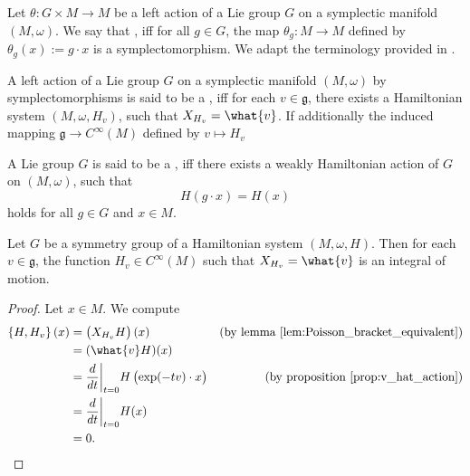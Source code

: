 Let $\theta : G \times M \to M$ be a left action of a Lie group $G$ on a symplectic manifold $(M,\omega)$. We say that , iff for all $g \in G$, the map $\theta_g : M \to M$ defined by $\theta_g(x) := g \cdot x$ is a symplectomorphism. We adapt the terminology provided in \cite[203]{salamon:symplectic_topology:2017}.

\begin{definition}
	A left action of a Lie group $G$ on a symplectic manifold $(M,\omega)$ by symplectomorphisms is said to be a , iff for each $v \in \mathfrak{g}$, there exists a Hamiltonian system $(M,\omega,H_v)$, such that $X_{H_v} = \what{v}$. If additionally the induced mapping $\mathfrak{g} \to C^\infty(M)$ defined by $v \mapsto H_v$
\end{definition}

\begin{definition}
	A Lie group $G$ is said to be a , iff there exists a weakly Hamiltonian action of $G$ on $(M,\omega)$, such that
	\begin{equation*}
		H(g \cdot x) = H(x)
	\end{equation*}
	\noindent holds for all $g \in G$ and $x \in M$.
\end{definition}

\begin{theorem}
	\label{thm:Noethers_theorem_Hamiltonian_case}
	Let $G$ be a symmetry group of a Hamiltonian system $(M,\omega,H)$. Then for each $v \in \mathfrak{g}$, the function $H_v \in C^\infty(M)$ such that $X_{H_v} = \what{v}$ is an integral of motion.
\end{theorem}

\begin{proof}
	Let $x \in M$. We compute
	\begin{align*}
		\cbr[0]{H,H_v}(x) &= \del[1]{X_{H_v}H}(x) & (\text{by lemma } \ref{lem:Poisson_bracket_equivalent})\\
		&= (\what{v}H)(x)\\
		&= \frac{d}{dt}\bigg\vert_{t = 0}H\del[1]{\exp(-tv) \cdot x} & (\text{by proposition } \ref{prop:v_hat_action})\\
		&= \frac{d}{dt}\bigg\vert_{t = 0}H(x)\\
		&= 0.
	\end{align*}
\end{proof}

